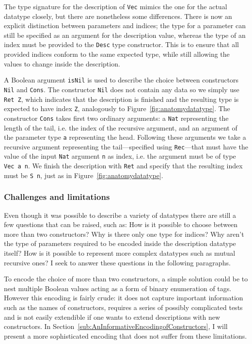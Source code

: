 \documentclass{ituthesis}
\newcommand{\ttconstructor}[1]{\textcolor{constructor-color}{\texttt{#1}}}
\newcommand{\tttype}[1]{\textcolor{type-color}{\texttt{#1}}}
\newcommand{\ttvar}[1]{\textcolor{local-var-color}{\texttt{#1}}}
\theoremstyle{break}
\begin{document}
The type signature for the description of \tttype{Vec} mimics the one for the actual datatype closely, but there are nonetheless some differences.
There is now an explicit distinction between parameters and indices; the type for a parameter can still be specified as an argument for the description value,
whereas the type of an index must be provided to the \tttype{Desc} type constructor.
This is to ensure that all provided indices conform to the same expected type, while still allowing the values to change inside the description.

A Boolean argument \ttvar{isNil} is used to describe the choice between constructors \ttconstructor{Nil} and \ttconstructor{Cons}.
The constructor \ttconstructor{Nil} does not contain any data so we simply use \ttconstructor{Ret~Z}, which indicates that the description is finished and the resulting type is expected to have index \ttconstructor{Z}, analogously to Figure~\ref{fig:anatomydatatype}.
The constructor \ttconstructor{Cons} takes first two ordinary arguments: a \tttype{Nat} representing the length of the tail, i.e. the index of the recursive argument, and an argument of the parameter type \ttvar{a} representing the head.
Following these arguments we take a recursive argument representing the tail---specified using \ttconstructor{Rec}---that must have the value of the input \tttype{Nat} argument \ttvar{n} as index, i.e. the argument must be of type \tttype{Vec}~\ttvar{a~n}.
We finish the description with \ttconstructor{Ret} and specify that the resulting index must be \ttconstructor{S}~\ttvar{n}, just as in Figure~\ref{fig:anatomydatatype}.

\subsubsection{Challenges and limitations}
Even though it was possible to describe a variety of datatypes there are still a few questions that can be raised, such as: How is it possible to choose between more than two constructors? Why is there only one type for indices?
Why aren't the type of parameters required to be encoded inside the description datatype itself? How is it possible to represent more complex datatypes such as mutual recursive ones? I seek to answer these questions in the following paragraphs.

To encode the choice of more than two constructors, a simple solution could be to nest multiple Boolean values acting as a form of binary enumeration of tags.
However this encoding is fairly crude: it does not capture important information such as the names of constructors, requires a series of possibly complicated tests and is not easily extendible if one wants to extend descriptions
with new constructors. In Section~\ref{sub:AnInformativeEncodingofConstructors}, I will present a more sophisticated encoding that does not suffer from these limitations.
\end{document}

